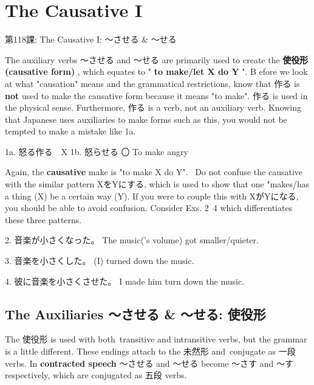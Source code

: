     
\chapter{The Causative I}

\begin{center}
\begin{Large}
第118課: The Causative I: ～させる \& ～せる 
\end{Large}
\end{center}
 
\par{ The auxiliary verbs ～させる and ～せる are primarily used to create the \textbf{使役形 (causative form) }, which equates to " \textbf{to make\slash let X do Y }". B efore we look at what "causation" means and the grammatical restrictions, know that 作る is \textbf{not }used to make the causative form because it means "to make". 作る is used in the physical sense. Furthermore, 作る is a verb, not an auxiliary verb. Knowing that Japanese uses auxiliaries to make forms such as this, you would not be tempted to make a mistake like 1a. }

\par{1a. 怒る作る　X \hfill\break
1b. 怒らせる 〇 \hfill\break
To make angry }

\par{ Again, the \textbf{causative }make is "to make X do Y".  Do not confuse the causative with the similar pattern XをYにする, which is used to show that one "makes\slash has a thing (X) be a certain way (Y). If you were to couple this with XがYになる, you should be able to avoid confusion. Consider Exs. 2~4 which differentiates these three patterns. }

\par{2. 音楽が小さくなった。 \hfill\break
The music('s volume) got smaller\slash quieter. }

\par{3. 音楽を小さくした。 \hfill\break
(I) turned down the music. }

\par{4. 彼に音楽を小さくさせた。 \hfill\break
I made him turn down the music. }
      
\section{The Auxiliaries ～させる \& ～せる: 使役形}
 
\par{ The 使役形 is used with both transitive and intransitive verbs, but the grammar is a little different. These endings attach to the 未然形 and conjugate as 一段 verbs. In \textbf{contracted speech }～させる and ～せる become ～さす and ～す respectively, which are conjugated as 五段 verbs. }

